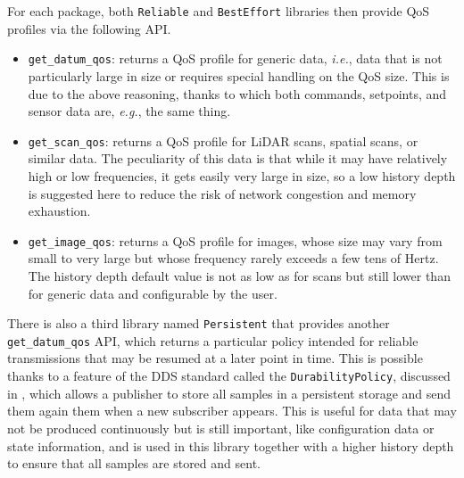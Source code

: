 For each package, both \texttt{Reliable} and \texttt{BestEffort} libraries then provide QoS profiles via the following API.
\begin{itemize}
  \item \texttt{get\_datum\_qos}: returns a QoS profile for generic data, \emph{i.e.}, data that is not particularly large in size or requires special handling on the QoS size. This is due to the above reasoning, thanks to which both commands, setpoints, and sensor data are, \emph{e.g.}, the same thing.
  \item \texttt{get\_scan\_qos}: returns a QoS profile for LiDAR scans, spatial scans, or similar data. The peculiarity of this data is that while it may have relatively high or low frequencies, it gets easily very large in size, so a low history depth is suggested here to reduce the risk of network congestion and memory exhaustion.
  \item \texttt{get\_image\_qos}: returns a QoS profile for images, whose size may vary from small to very large but whose frequency rarely exceeds a few tens of Hertz. The history depth default value is not as low as for scans but still lower than for generic data and configurable by the user.
\end{itemize}
There is also a third library named \texttt{Persistent} that provides another \texttt{get\_datum\_qos} API, which returns a particular policy intended for reliable transmissions that may be resumed at a later point in time. This is possible thanks to a feature of the DDS standard called the \texttt{DurabilityPolicy}, discussed in , which allows a publisher to store all samples in a persistent storage and send them again them when a new subscriber appears. This is useful for data that may not be produced continuously but is still important, like configuration data or state information, and is used in this library together with a higher history depth to ensure that all samples are stored and sent.

